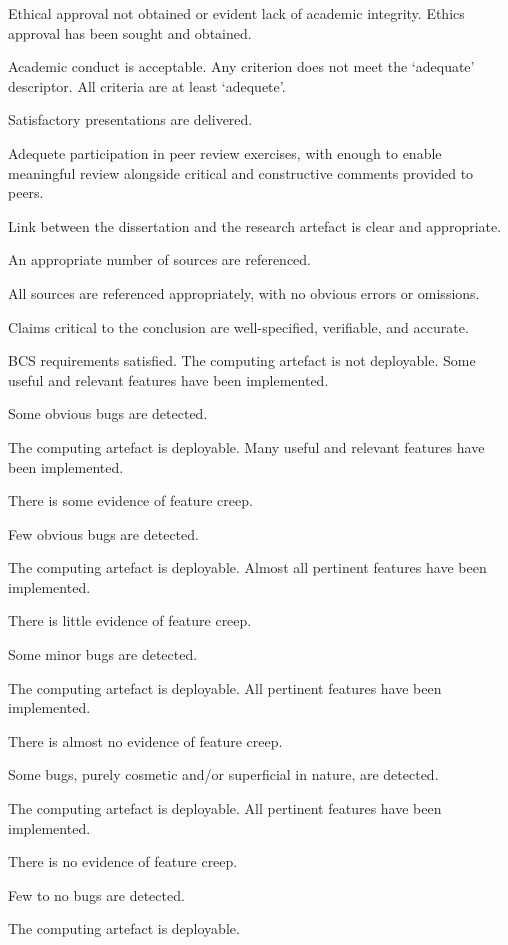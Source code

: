 \begin{markingrubric}
%
		\grade\fail Ethical approval not obtained or evident lack of academic integrity.
		\grade Ethics approval has been sought and obtained. \par Academic conduct is acceptable.
%
		\grade\fail Any criterion does not meet the `adequate' descriptor.
		\grade All criteria are at least `adequete'.
                       \par Satisfactory presentations are delivered.
		  \par Adequete participation in peer review exercises, with enough to enable meaningful review alongside critical and constructive comments provided to peers.
		  \par Link between the dissertation and the research artefact is clear and appropriate.
		  \par An appropriate number of sources are referenced.
		  \par All sources are referenced appropriately, with no obvious errors or omissions.
		  \par Claims critical to the conclusion are well-specified, verifiable, and accurate.
		  \par BCS requirements satisfied.
%
        \grade \fail The computing artefact is not deployable.
        \grade Some useful and relevant features have been implemented.
            \par Some obvious bugs are detected.
            \par The computing artefact is deployable.
        \grade Many useful and relevant features have been implemented.
            \par There is some evidence of feature creep.
            \par Few obvious bugs  are detected.
            \par The computing artefact is deployable.
        \grade Almost all pertinent features have been implemented.
            \par There is little evidence of feature creep.
            \par Some minor bugs  are detected.
            \par The computing artefact is deployable.
        \grade All pertinent features have been implemented.
            \par There is almost no evidence of feature creep.
            \par Some bugs, purely cosmetic and/or superficial in nature, are detected.
            \par The computing artefact is deployable.
        \grade All pertinent features have been implemented.
            \par There is no evidence of feature creep.
            \par Few to no bugs are detected.
            \par The computing artefact is deployable.
%
\end{markingrubric}

